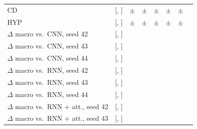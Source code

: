 \begin{tabular}{lccccccc}
CD & \transformerFinalFirstTestAurocCD{} [\transformerFinalFirstTestAurocCDLo{}, \transformerFinalFirstTestAurocCDHi{}] & \transformerFinalTestAurocCDMean{} $\pm$ \transformerFinalTestAurocCDSd{} & \cnnFinalTestAurocCDMean{} $\pm$ \cnnFinalTestAurocCDSd{} & \rnnFinalTestAurocCDMean{} $\pm$ \rnnFinalTestAurocCDSd{} & \rnnAttnfinalTestAurocCDMean{} $\pm$ \rnnAttnfinalTestAurocCDSd{} & \denseFinalTestAurocCDMean{} $\pm$ \denseFinalTestAurocCDSd{} & \trivialTestAurocCD{} \\
HYP & \transformerFinalFirstTestAurocHYP{} [\transformerFinalFirstTestAurocHYPLo{}, \transformerFinalFirstTestAurocHYPHi{}] & \transformerFinalTestAurocHYPMean{} $\pm$ \transformerFinalTestAurocHYPSd{} & \cnnFinalTestAurocHYPMean{} $\pm$ \cnnFinalTestAurocHYPSd{} & \rnnFinalTestAurocHYPMean{} $\pm$ \rnnFinalTestAurocHYPSd{} & \rnnAttnfinalTestAurocHYPMean{} $\pm$ \rnnAttnfinalTestAurocHYPSd{} & \denseFinalTestAurocHYPMean{} $\pm$ \denseFinalTestAurocHYPSd{} & \trivialTestAurocHYP{} \\
\midrule
$\Delta$ macro vs.\ CNN, seed 42 & \transformerDiffCnnSFourTwo{} [\transformerDiffCnnLoSFourTwo{}, \transformerDiffCnnHiSFourTwo{}] & & & & & & \\
$\Delta$ macro vs.\ CNN, seed 43 & \transformerDiffCnnSFourThree{} [\transformerDiffCnnLoSFourThree{}, \transformerDiffCnnHiSFourThree{}] & & & & & & \\
$\Delta$ macro vs.\ CNN, seed 44 & \transformerDiffCnnSFourFour{} [\transformerDiffCnnLoSFourFour{}, \transformerDiffCnnHiSFourFour{}] & & & & & & \\
$\Delta$ macro vs.\ RNN, seed 42 & \transformerDiffRnnSFourTwo{} [\transformerDiffRnnLoSFourTwo{}, \transformerDiffRnnHiSFourTwo{}] & & & & & & \\
$\Delta$ macro vs.\ RNN, seed 43 & \transformerDiffRnnSFourThree{} [\transformerDiffRnnLoSFourThree{}, \transformerDiffRnnHiSFourThree{}] & & & & & & \\
$\Delta$ macro vs.\ RNN, seed 44 & \transformerDiffRnnSFourFour{} [\transformerDiffRnnLoSFourFour{}, \transformerDiffRnnHiSFourFour{}] & & & & & & \\
$\Delta$ macro vs.\ RNN + att., seed 42 & \transformerDiffRnnAttnSFourTwo{} [\transformerDiffRnnAttnLoSFourTwo{}, \transformerDiffRnnAttnHiSFourTwo{}] & & & & & & \\
$\Delta$ macro vs.\ RNN + att., seed 43 & \transformerDiffRnnAttnSFourThree{} [\transformerDiffRnnAttnLoSFourThree{}, \transformerDiffRnnAttnHiSFourThree{}] & & & & & & \\

\end{tabular}

